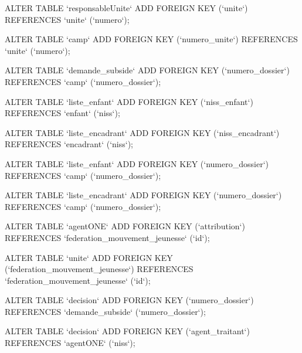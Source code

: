 ALTER TABLE `responsableUnite` ADD FOREIGN KEY (`unite`) REFERENCES `unite` (`numero`);

ALTER TABLE `camp` ADD FOREIGN KEY (`numero_unite`) REFERENCES `unite` (`numero`);

ALTER TABLE `demande_subside` ADD FOREIGN KEY (`numero_dossier`) REFERENCES `camp` (`numero_dossier`);

ALTER TABLE `liste_enfant` ADD FOREIGN KEY (`niss_enfant`) REFERENCES `enfant` (`niss`);

ALTER TABLE `liste_encadrant` ADD FOREIGN KEY (`niss_encadrant`) REFERENCES `encadrant` (`niss`);

ALTER TABLE `liste_enfant` ADD FOREIGN KEY (`numero_dossier`) REFERENCES `camp` (`numero_dossier`);

ALTER TABLE `liste_encadrant` ADD FOREIGN KEY (`numero_dossier`) REFERENCES `camp` (`numero_dossier`);

ALTER TABLE `agentONE` ADD FOREIGN KEY (`attribution`) REFERENCES `federation_mouvement_jeunesse` (`id`);

ALTER TABLE `unite` ADD FOREIGN KEY (`federation_mouvement_jeunesse`) REFERENCES `federation_mouvement_jeunesse` (`id`);

ALTER TABLE `decision` ADD FOREIGN KEY (`numero_dossier`) REFERENCES `demande_subside` (`numero_dossier`);

ALTER TABLE `decision` ADD FOREIGN KEY (`agent_traitant`) REFERENCES `agentONE` (`niss`);